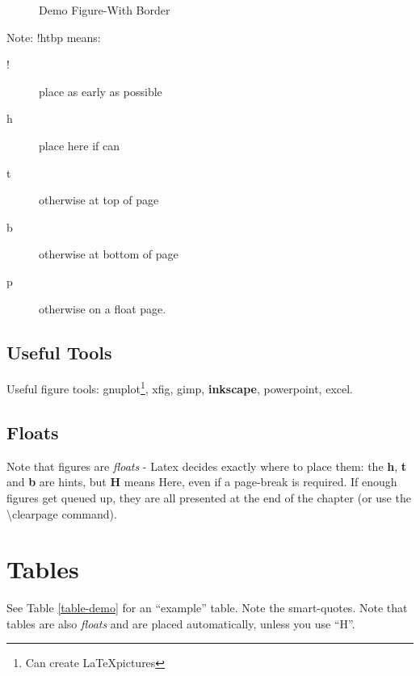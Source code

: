 \documentclass[a4paper,12pt]{report}
\begin{document}
\begin{figure}[!htbp]
\centerline{
}
\caption{Demo Figure-With Border}
\label{fig-demob}
\end{figure}

Note: !htbp means:
\begin{description}
\item[!] place as early as possible
\item[h] place here if can
\item[t] otherwise at top of page
\item[b] otherwise at bottom of page
\item[p] otherwise on a float page.
\end{description}

\subsection{Useful Tools}

Useful figure tools: gnuplot\footnote{Can create \LaTeX pictures}, xfig, gimp, \textbf{inkscape}, powerpoint, excel.

\subsection{Floats}

Note that figures are \textit{floats} - Latex decides exactly where to place them: the \textbf{h}, \textbf{t} and \textbf{b} are hints, but \textbf{H} means Here, even if a page-break is required. If enough figures get queued up, they are all presented at the end of the chapter (or use the \textbackslash clearpage command).

\clearpage

\section{Tables}

See Table \ref{table-demo} for an ``example'' table. Note the smart-quotes. Note that tables are also \textit{floats} and are placed automatically, unless you use ``H''.
\end{document}
